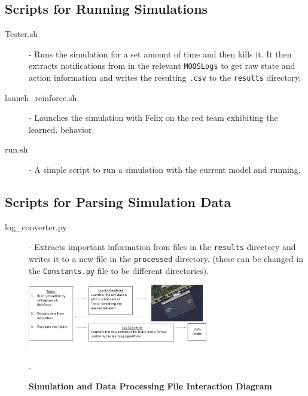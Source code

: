 \documentclass[onecolumn,letterpaper,11pt]{article}
\begin{document}
\subsection{Scripts for Running Simulations}
\begin{description}
	\item[Tester.sh] - Runs the simulation for a set amount of time and then kills it. It then extracts notifications from  in the relevant \texttt{MOOSLogs} to get raw state and action information and writes the resulting \texttt{.csv} to the \texttt{results} directory.
	
	\item[launch\_reinforce.sh] - Launches the simulation with Felix on the red team exhibiting the learned. behavior.
	
	\item[run.sh] - A simple script to run a simulation with the current model and  running.	
\end{description}  


\subsection{Scripts for Parsing Simulation Data}
\begin{description}
	\item[log\_converter.py] - Extracts important information from files in the \texttt{results} directory and writes it to a new file in the \texttt{processed} directory. (these can be changed in the \texttt{Constants.py} file to be different directories).
\end{description}

\begin{figure}[H]
	\centering 
	\includegraphics[width=0.7\textwidth]{../Images/SimulationInteractionDiagram.png}
	\caption{{\bf Simulation and Data Processing File Interaction Diagram}}.
	\label{fig_sim_diagram}
\end{figure}

\vspace{0.1in}


\end{document}
